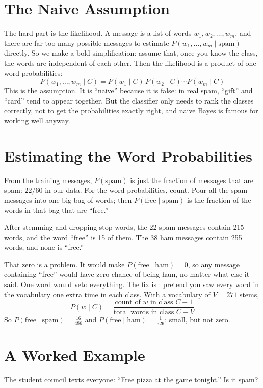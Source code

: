 \section{The Naive Assumption}
The hard part is the likelihood. A message is a list of words $w_1, w_2, \ldots, w_m$, and there are far too
many possible messages to estimate $P(w_1, \ldots, w_m \mid \text{spam})$ directly. So we make a bold
simplification: assume that, once you know the class, the words are independent of each other. Then the
likelihood is a product of one-word probabilities:
$$P(w_1, \ldots, w_m \mid C) = P(w_1 \mid C)\,P(w_2 \mid C) \cdots P(w_m \mid C)$$
This is the  assumption. It is ``naive'' because it is false: in real spam, ``gift'' and
``card'' tend to appear together. But the classifier only needs to rank the classes correctly, not to get the
probabilities exactly right, and naive Bayes is famous for working well anyway.

\section{Estimating the Word Probabilities}
From the training messages, $P(\text{spam})$ is just the fraction of messages that are spam: $22/60$ in our
data. For the word probabilities, count. Pour all the spam messages into one big bag of words; then
$P(\text{free} \mid \text{spam})$ is the fraction of the words in that bag that are ``free.''

After stemming and dropping stop words, the 22 spam messages contain 215 words, and the word ``free'' is 15 of
them. The 38 ham messages contain 255 words, and none is ``free.''

That zero is a problem. It would make $P(\text{free} \mid \text{ham}) = 0$, so any message containing ``free''
would have zero chance of being ham, no matter what else it said. One word would veto everything. The fix is
: pretend you saw every word in the vocabulary one extra time
in each class. With a vocabulary of $V = 271$ stems,
$$P(w \mid C) = \frac{\text{count of } w \text{ in class } C + 1}{\text{total words in class } C + V}$$
So $P(\text{free} \mid \text{spam}) = \frac{16}{486}$ and $P(\text{free} \mid \text{ham}) = \frac{1}{526}$:
small, but not zero.

\section{A Worked Example}
The student council texts everyone: ``Free pizza at the game tonight.'' Is it spam?

